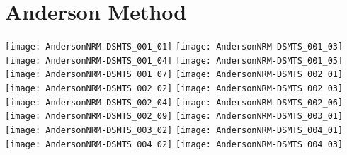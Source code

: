 \documentclass[notitlepage]{revtex4-1}
\begin{document}
\section{Anderson Method}
\texttt{[image: AndersonNRM-DSMTS\_001\_01]}
\texttt{[image: AndersonNRM-DSMTS\_001\_03]}
\texttt{[image: AndersonNRM-DSMTS\_001\_04]}
\texttt{[image: AndersonNRM-DSMTS\_001\_05]}
\texttt{[image: AndersonNRM-DSMTS\_001\_07]}
\texttt{[image: AndersonNRM-DSMTS\_002\_01]}
\texttt{[image: AndersonNRM-DSMTS\_002\_02]}
\texttt{[image: AndersonNRM-DSMTS\_002\_03]}
\texttt{[image: AndersonNRM-DSMTS\_002\_04]}
\texttt{[image: AndersonNRM-DSMTS\_002\_06]}
\texttt{[image: AndersonNRM-DSMTS\_002\_09]}
\texttt{[image: AndersonNRM-DSMTS\_003\_01]}
\texttt{[image: AndersonNRM-DSMTS\_003\_02]}
\texttt{[image: AndersonNRM-DSMTS\_004\_01]}
\texttt{[image: AndersonNRM-DSMTS\_004\_02]}
\texttt{[image: AndersonNRM-DSMTS\_004\_03]}
\end{document}
